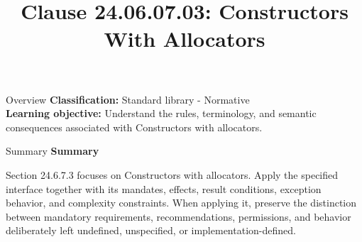 \documentclass[10pt,letterpaper]{article}
\title{Clause 24.06.07.03: Constructors With Allocators}
\author{}
\date{}
\begin{document}
\maketitle
\begin{CornellOverviewBox}{Overview}
\textbf{Classification:} Standard library - Normative\\[2pt]
\textbf{Learning objective:} Understand the rules, terminology, and semantic consequences associated with Constructors with allocators.
\end{CornellOverviewBox}\begin{CornellSummaryBox}{Summary}
{\sffamily\bfseries\color{Accent} Summary}\par\vspace{3pt}Section 24.6.7.3 focuses on Constructors with allocators. Apply the specified interface together with its mandates, effects, result conditions, exception behavior, and complexity constraints. When applying it, preserve the distinction between mandatory requirements, recommendations, permissions, and behavior deliberately left undefined, unspecified, or implementation-defined.
\end{CornellSummaryBox}
\end{document}
